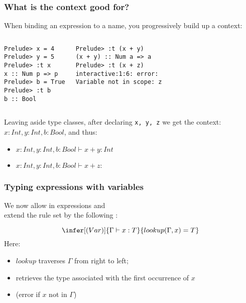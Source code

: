 \documentclass{beamer}
\begin{document}
\begin{frame}[fragile]\frametitle{What is the context good for?} 

  When binding an expression to a name, you progressively build up a context:
\vspace{-3mm}
\begin{columns}[t]
\begin{verbatim}
Prelude> x = 4
Prelude> y = 5
Prelude> :t x
x :: Num p => p
Prelude> b = True
Prelude> :t b
b :: Bool
\end{verbatim}
\begin{verbatim}
Prelude> :t (x + y)
(x + y) :: Num a => a
Prelude> :t (x + z)
interactive:1:6: error: 
Variable not in scope: z
\end{verbatim}
\end{columns}

\vspace{3mm}
Leaving aside type classes, after declaring \texttt{x, y, z} we get the
context: $x : Int, y: Int, b : Bool$, and thus:

\begin{itemize}
\item $x : Int, y: Int, b : Bool \vdash x + y: Int$
\item $x : Int, y: Int, b : Bool \vdash x + z:$ \faFlash
\end{itemize}

\end{frame}


\begin{frame}[fragile]\frametitle{Typing expressions with variables}

  We now allow  in expressions and\\
  extend the rule set by the following :

  $$
  \infer[(Var)]{\Gamma \vdash x : T}{
    lookup(\Gamma, x) = T}
  $$
  Here:
  \begin{itemize}
  \item $lookup$ traverses $\Gamma$ from right to left;
  \item retrieves the type associated with the first occurrence of $x$
  \item (error if $x$ not in $\Gamma$)
  \end{itemize}
\end{frame}
\end{document}
